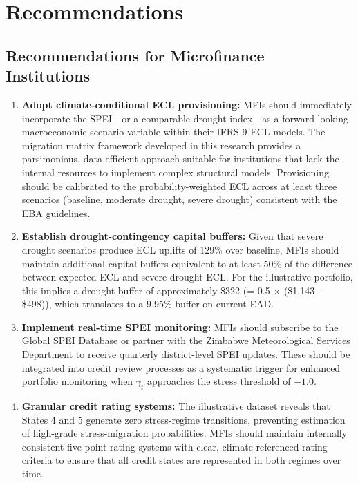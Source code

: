 \documentclass[12pt,a4paper]{article}
\begin{document}
\section{Recommendations}

\subsection{Recommendations for Microfinance Institutions}

\begin{enumerate}[noitemsep]
    \item \textbf{Adopt climate-conditional ECL provisioning:} MFIs should immediately incorporate the SPEI---or a comparable drought index---as a forward-looking macroeconomic scenario variable within their IFRS 9 ECL models. The migration matrix framework developed in this research provides a parsimonious, data-efficient approach suitable for institutions that lack the internal resources to implement complex structural models. Provisioning should be calibrated to the probability-weighted ECL across at least three scenarios (baseline, moderate drought, severe drought) consistent with the EBA guidelines.

    \item \textbf{Establish drought-contingency capital buffers:} Given that severe drought scenarios produce ECL uplifts of 129\% over baseline, MFIs should maintain additional capital buffers equivalent to at least 50\% of the difference between expected ECL and severe drought ECL. For the illustrative portfolio, this implies a drought buffer of approximately \$322 (= 0.5 $\times$ (\$1,143 -- \$498)), which translates to a 9.95\% buffer on current EAD.

    \item \textbf{Implement real-time SPEI monitoring:} MFIs should subscribe to the Global SPEI Database or partner with the Zimbabwe Meteorological Services Department to receive quarterly district-level SPEI updates. These should be integrated into credit review processes as a systematic trigger for enhanced portfolio monitoring when $\gamma_t$ approaches the stress threshold of $-1.0$.

    \item \textbf{Granular credit rating systems:} The illustrative dataset reveals that States 4 and 5 generate zero stress-regime transitions, preventing estimation of high-grade stress-migration probabilities. MFIs should maintain internally consistent five-point rating systems with clear, climate-referenced rating criteria to ensure that all credit states are represented in both regimes over time.
\end{enumerate}
\end{document}
